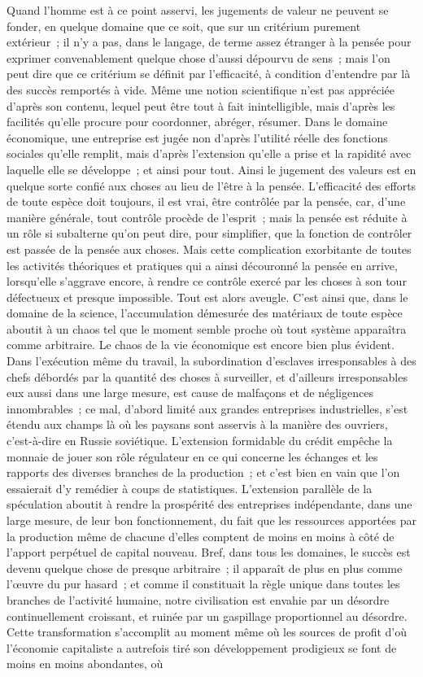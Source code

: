 \documentclass[french,twoside]{book} %
\begin{document}
Quand l'homme est à ce point asservi, les jugements de valeur ne peuvent se fonder, en quelque domaine que ce soit, que sur un critérium purement extérieur ; il n'y a pas, dans le langage, de terme assez étranger à la pensée pour exprimer convenablement quelque chose d'aussi dépourvu de sens ; mais l'on peut dire que ce critérium se définit par l'efficacité, à condition d'entendre par là des succès remportés à vide. Même une notion scientifique n'est pas appréciée d'après son contenu, lequel peut être tout à fait inintelligible, mais d'après les facilités qu'elle procure pour coordonner, abréger, résumer. Dans le domaine économique, une entreprise est jugée non d'après l'utilité réelle des fonctions sociales qu'elle remplit, mais d'après l'extension qu'elle a prise et la rapidité avec laquelle elle se développe ; et ainsi pour tout. Ainsi le jugement des valeurs est en quelque sorte confié aux choses au lieu de l'être à la pensée. L'efficacité des efforts de toute espèce doit toujours, il est vrai, être contrôlée par la pensée, car, d'une manière générale, tout contrôle procède de l'esprit ; mais la pensée est réduite à un rôle si subalterne qu'on peut dire, pour simplifier, que la fonction de contrôler est passée de la pensée aux choses. Mais cette complication exorbitante de toutes les activités théoriques et pratiques qui a ainsi découronné la pensée en arrive, lorsqu'elle s'aggrave encore, à rendre ce contrôle exercé par les choses à son tour défectueux et presque impossible. Tout est alors aveugle. C'est ainsi que, dans le domaine de la science, l'accumulation démesurée des matériaux de toute espèce aboutit à un chaos tel que le moment semble proche où tout système apparaîtra comme arbitraire. Le chaos de la vie économique est encore bien plus évident. Dans l'exécution même du travail, la subordination d'esclaves irresponsables à des chefs débordés par la quantité des choses à surveiller, et d'ailleurs irresponsables eux aussi dans une large mesure, est cause de malfaçons et de négligences innombrables ; ce mal, d'abord limité aux grandes entreprises industrielles, s'est étendu aux champs là où les paysans sont asservis à la manière des ouvriers, c'est-à-dire en Russie soviétique. L'extension formidable du crédit empêche la monnaie de jouer son rôle régulateur en ce qui concerne les échanges et les rapports des diverses branches de la production ; et c'est bien en vain que l'on essaierait d'y remédier à coups de statistiques. L'extension parallèle de la spéculation aboutit à rendre la prospérité des entreprises indépendante, dans une large mesure, de leur bon fonctionnement, du fait que les ressources apportées par la production même de chacune d'elles comptent de moins en moins à côté de l'apport perpétuel de capital nouveau. Bref, dans tous les domaines, le succès est devenu quelque chose de presque arbitraire ; il apparaît de plus en plus comme l'œuvre du pur hasard ; et comme il constituait la règle unique dans toutes les branches de l'activité humaine, notre civilisation est envahie par un désordre continuellement croissant, et ruinée par un gaspillage proportionnel au désordre. Cette transformation s'accomplit au moment même où les sources de profit d'où l'économie capitaliste a autrefois tiré son développement prodigieux se font de moins en moins abondantes, où 
\end{document}
